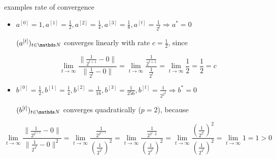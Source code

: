 \documentclass[11pt,compress,t,notes=noshow, xcolor=table]{beamer}
\begin{document}
\begin{vbframe}{examples rate of convergence}

\begin{itemize}
  \item $a^{[0]} = 1, a^{[1]} = \frac12, a^{[2]}  = \frac14, a^{[3]}  = \frac18,
  a^{[t]}  = \frac1{2^t} \Rightarrow a^\ast = 0$

  \lz

  $(a^{[t]} )_{t \in \N}$ converges linearly with rate $c=\frac12$, since

  $$
    \lim_{t \rightarrow \infty} \frac{\|\frac1{2^{t+1}}-0\|}{\|\frac1{2^t}- 0\|}
    = \lim_{t \rightarrow \infty} \frac{\frac1{2^{t+1}}}{\frac1{2^t}}
    = \lim_{t \rightarrow \infty} \frac12 = \frac12 = c
  $$

  \item $b^{[0]}  = \frac12, b^{[1]}  = \frac14, b^{[2]}  = \frac1{16}, b^{[3]}  = \frac1{256},
  b^{[t]}  = \frac1{{2^2}^t} \Rightarrow b^\ast = 0$

  \lz

  $(b^{[t]} )_{t \in \N}$ converges quadratically ($p=2$), because
\end{itemize}

\begin{footnotesize}
$$
  \lim_{t \rightarrow \infty} \frac{\|\frac1{2^{2^{t+1}}}-0\|}{\|\frac1{2^{2^t}}- 0\|^2}
= \lim_{t \rightarrow \infty} \frac{  \frac1{2^{2^{t+1}}}}{\left(\frac1{2^{2^t}}\right)^2}
= \lim_{t \rightarrow \infty} \frac{  \frac1{2^{2^t \cdot 2}}}{\left(\frac1{2^{2^t}}\right)^2}
= \lim_{t \rightarrow \infty} \frac{\left(\frac1{2^{2^t}}\right)^2}{\left(\frac1{2^{2^t}}\right)^2}
= \lim_{t \rightarrow \infty} 1 = 1 > 0
$$
\end{footnotesize}

\begin{comment}
\framebreak

The sequences
$$
x^{[t]} = 1 + 0.5^t, \quad y^{[t]} = 1 + t^{-t}, \quad z^{[t]} = 1 + 0.5^{2^t}
$$
converge to $\xv^\star = y^\star = z^\star = 1$ for $t \rightarrow \infty$.
\begin{eqnarray*}
\frac{|x^{[t + 1]]} - x^\ast|}{|x^{[t]} - x^\ast|} &=& \frac{1 + 0.5^{t + 1} - 1}{1 + 0.5^t - 1} = 0.5 \\
\frac{|y^{[t + 1]} - y^\ast|}{|y^{[t]} - y^\ast|} &=& \frac{t^{-t}}{(t + 1)^{t + 1}} =
\frac{1}{t + 1} \left(\frac{1}{1 + \frac{1}{t}}\right)^t \rightarrow 0 \\
\frac{|z^{[i + 1]} - z^\ast|}{|z^{[t]} - z^\ast|^2} &=& \frac{0.5^{2^{t + 1}}}{\left( 0.5^{2^t} \right)^2} = 1
\end{eqnarray*}
\end{comment}
\end{vbframe}
\end{document}
